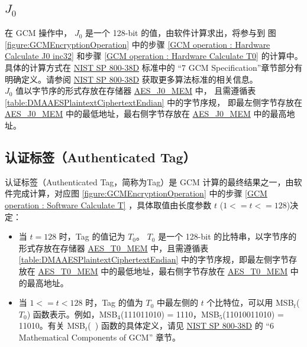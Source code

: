 \documentclass[main\_\_CN.tex]{subfiles}
\begin{document}

\subsection{\texorpdfstring{$J_0$}{J0}} \label{Label J0}
在 GCM 操作中， $J_0$ 是一个 128-bit 的值，由软件计算求出，将参与到 图 \ref{figure:GCMEncryptionOperation} 中的步骤 \ref{GCM operation : Hardware Calculate J0 inc32} 和步骤 \ref{GCM operation : Hardware Calculate T0}  的计算中。
具体的计算方式在 \href{https://nvlpubs.nist.gov/nistpubs/Legacy/SP/nistspecialpublication800-38d.pdf}{NIST SP 800-38D} 标准中的 “7 GCM Specification”章节部分有明确定义。请参阅 \href{https://nvlpubs.nist.gov/nistpubs/Legacy/SP/nistspecialpublication800-38d.pdf}{NIST SP 800-38D} 获取更多算法标准的相关信息。\\
$J_0$ 值以字节序的形式存放在存储器 \hyperref[memdesc:AESJ0MEM]{AES\_J0\_MEM} 中\label{memdesc:AESJ0MEM}，
且需遵循表 \ref{table:DMAAESPlaintextCiphertextEndian} 中的字节序规，
即最左侧字节存放在 \hyperref[memdesc:AESJ0MEM]{AES\_J0\_MEM} 中的最低地址，最右侧字节存放在 \hyperref[memdesc:AESJ0MEM]{AES\_J0\_MEM} 中的最高地址。



\subsection{认证标签（Authenticated Tag）}\label{Label Authenticated Tag}

认证标签（Authenticated Tag，简称为Tag）是 GCM 计算的最终结果之一，由软件完成计算，对应图 \ref{figure:GCMEncryptionOperation} 中的步骤 \ref{GCM operation : Software Calculate T} ，具体取值由长度参数 $t$ ($1 <= t <= 128$)决定：
\begin{itemize}
    \item 当 $t = 128$ 时，Tag 的值记为 $T_0$。 $T_0$ 是一个 128-bit 的比特串，以字节序的形式存放在存储器 \hyperref[memdesc:AEST0MEM]{AES\_T0\_MEM} 中\label{memdesc:AEST0MEM}，且需遵循表 \ref{table:DMAAESPlaintextCiphertextEndian} 中的字节序规，即最左侧字节存放在 \hyperref[memdesc:AEST0MEM]{AES\_T0\_MEM} 中的最低地址，最右侧字节存放在 \hyperref[memdesc:AEST0MEM]{AES\_T0\_MEM} 中的最高地址。
    \item 当 $1 <= t < 128$ 时，Tag 的值为 $T_0$ 中最左侧的 $t$ 个比特位，可以用 MSB$_t$($T_0$)  函数表示。例如，MSB$_4$(111011010) = 1110，MSB$_5$(11010011010) = 11010。有关 MSB$_t$(\ ) 函数的具体定义，请见 \href{https://nvlpubs.nist.gov/nistpubs/Legacy/SP/nistspecialpublication800-38d.pdf}{NIST SP 800-38D} 的 “6 Mathematical Components of GCM” 章节。
\end{itemize}
\end{document}
